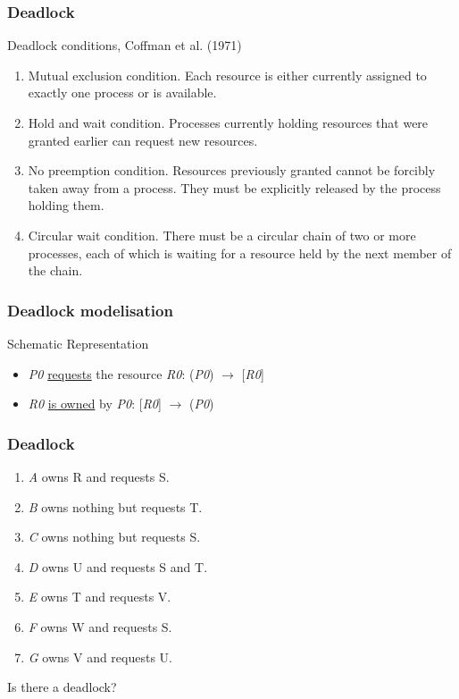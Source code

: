 \begin{frame}
  \frametitle{Deadlock}
  \begin{block}{Deadlock conditions, Coffman et al. (1971)}
    \begin{enumerate}
      \item Mutual exclusion condition. Each resource is either currently assigned to exactly one process or is available.
      \item Hold and wait condition. Processes currently holding resources that were granted earlier can request new resources.
      \item No preemption condition. Resources previously granted cannot be forcibly taken away from a process. They must be explicitly released by the process holding them.
      \item Circular wait condition. There must be a circular chain of two or more processes, each of which is waiting for a resource held by the next member of the chain.
    \end{enumerate}
  \end{block}
\end{frame}

\begin{frame}
  \frametitle{Deadlock modelisation}
  \begin{block}{Schematic Representation}
    \begin{itemize}
      \item \emph{P0} \underline{requests} the resource \emph{R0}: (\emph{P0}) $\longrightarrow$ [\emph{R0}]
      \item \emph{R0} \underline{is owned} by \emph{P0}: [\emph{R0}] $\longrightarrow$ (\emph{P0})
    \end{itemize}
  \end{block}
\end{frame}

\begin{frame}
  \frametitle{Deadlock}
  \begin{enumerate}
    \item \emph{A} owns R and requests S.
    \item \emph{B} owns nothing but requests T.
    \item \emph{C} owns nothing but requests S.
    \item \emph{D} owns U and requests S and T.
    \item \emph{E} owns T and requests V.
    \item \emph{F} owns W and requests S.
    \item \emph{G} owns V and requests U.
  \end{enumerate}
  Is there a deadlock?
\end{frame}

